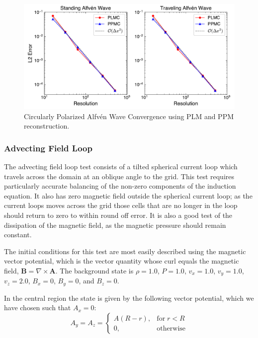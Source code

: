 \documentclass[modern, linenumbers]{aastex631}
\newcommand*{\img}[1]{%
    \raisebox{-.3\baselineskip}{%
        \texttt{[image: \#1]}%
    }%
}
\begin{document}
\begin{figure}[ht!]
    \includegraphics[width=\linewidth]{cpaw_convergence.pdf}
    \caption{Circularly Polarized Alfv\'en Wave Convergence using PLM and PPM reconstruction. \href{https://github.com/bcaddy/caddy-et-al-2023/blob/a5d284c28192e6ae8b0c09e82f75a36456cf0ca6/python/circularly-polarized-alfven-convergence.py}{\img{github.png}}}
    \label{fig:cpaw}
\end{figure}

\subsubsection{Advecting Field Loop}
\label{sec:afl}

The advecting field loop test consists of a tilted spherical current loop which travels across the domain at an oblique angle to the grid. This test requires particularly accurate balancing of the non-zero components of the induction equation. It also has zero magnetic field outside the spherical current loop; as the current loops moves across the grid those cells that are no longer in the loop should return to zero to within round off error. It is also a good test of the dissipation of the magnetic field, as the magnetic pressure should remain constant.

The initial conditions for this test are most easily described using the magnetic vector potential, which is the vector quantity whose curl equals the magnetic field, $\boldsymbol{B} = \nabla \times\boldsymbol{A}$. The background state is
$\rho = 1.0$,
$P = 1.0$,
$v_x = 1.0$,
$v_y = 1.0$,
$v_z = 2.0$,
$B_x = 0$,
$B_y = 0$, and
$B_z = 0$.

In the central region the state is given by the following vector potential, which we have chosen such that $A_x = 0$:
\begin{equation}
    A_y = A_z =
    \begin{cases}
        A \left( R - r \right),& \text{for}\; r < R\\
        0,              & \text{otherwise}
    \end{cases}
\end{equation}
\end{document}
